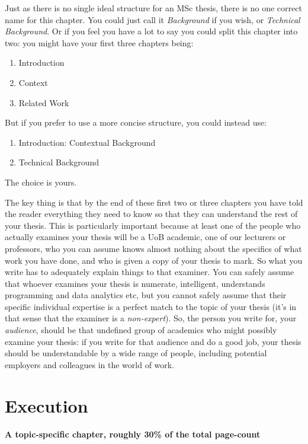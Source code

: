 \documentclass[ %
                    author={Daniel Page},
                supervisor={Dr. Andrew Calway},
                    degree={MSc},
                     title={Some Structural Guidelines for Data Science MSc Theses, Including Those With Long Titles that Run Across Multiple Lines on the Front Page},
                  subtitle={And those including an optional subtitle too, for good measure},
                      type={},
                      year={2021}]{dissertation}
\begin{document}
Just as there is no single ideal structure for an MSc thesis, there is no one correct name for this chapter. You could just call it {\em Background}\/ if you wish, or {\em Technical Background}. Or if you feel you have a lot to say you could split this chapter into two: you might have your first three chapters being:
\begin{enumerate}
\item Introduction
\item Context
\item Related Work
\end{enumerate}
\noindent
But if you prefer to use a more concise structure, you could instead use:
\begin{enumerate}
\item Introduction: Contextual Background
\item Technical Background
\end{enumerate}
\noindent
The choice is yours. 


The key thing is that by the end of these first two or three chapters you have told the reader everything they need to know so that they can understand the rest of your thesis. This is particularly important because at least one of the people who actually examines your thesis will be a UoB academic, one of our lecturers or professors, who you can assume knows almost nothing about the specifics of what work you have done, and who is given a copy of your thesis to mark. So what you write has to adequately explain things to that examiner. You can safely assume that whoever examines your thesis is numerate, intelligent, understands programming and data analytics etc, but you cannot safely assume that their specific individual expertise is a perfect match to the topic of your thesis (it's in that sense that the examiner is a {\em non-expert}). So, the person you write for, your {\em audience}, should be that undefined group of academics who might possibly examine your thesis: if you write for that audience and do a good job, your thesis should be understandable by a wide range of people, including potential employers and colleagues in the world of work.


\chapter{Execution}
\label{chap:execution}

{\bf A topic-specific chapter, roughly 30\% of the total page-count}
\vspace{1cm} 
\end{document}
